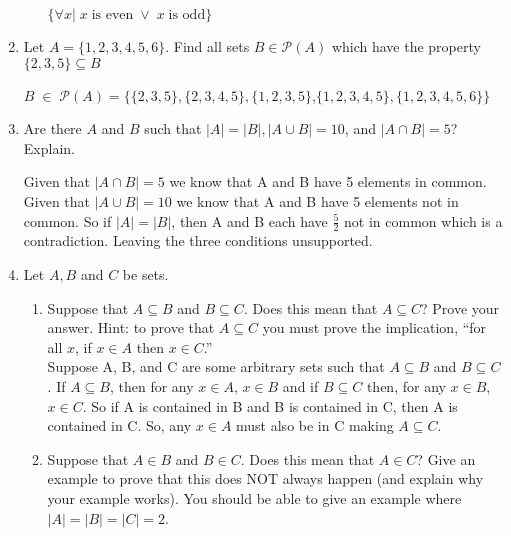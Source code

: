 \documentclass[11pt, a4paper]{article}
\newcommand\setItemNumber[1]{\setcounter{enumi}{\numexpr#1-1\relax}}
\begin{document}
\begin{enumerate}
\begin{enumerate}
                $\{\forall x|\; x\; \text{is even}\; \lor\; x\; \text{is odd}\}$ %

        \end{enumerate}

    \setItemNumber{19}
    \item Let $A = \{1,2,3,4,5,6\}$. Find all sets $B\in\mathcal{P}(A)$ which have the property $\{2,3,5\}\subseteq B$

        $B \;\in\;\mathcal{P}(A) = \{\{2,3,5\},\{2,3,4,5\},\{1,2,3,5\}$,$\{1,2,3,4,5\},\{1,2,3,4,5,6\}\}$

    \setItemNumber{22}
    \item Are there $A$ and $B$ such that $|A| = |B|,|A\cup B| = 10$, and $|A\cap B| = 5$? Explain.

        Given that $|A\cap B|=5$ we know that A and B have 5 elements in common. Given that $|A\cup B|= 10$ we know that A and B have 5 elements not in common. So if $|A|=|B|$, then A and B each have $\frac{5}{2}$ not in common which is a contradiction. Leaving the three conditions unsupported.

    \setItemNumber{25}
    \item Let $A, B$ and $C$ be sets.
        \begin{enumerate}
            \item Suppose that $A \subseteq B$ and $B\subseteq C$. Does this mean that $A \subseteq C$? Prove your answer. Hint: to prove that $A\subseteq C$ you must prove the implication, “for all $x$, if $x\in A$ then $x\in C$.”\\

                Suppose A, B, and C are some arbitrary sets such that $A\subseteq B$ and $B\subseteq C$. If $A\subseteq B$, then for any $x\in A$, $x\in B$ and if $B\subseteq C$ then, for any $x\in B$, $x\in C$. So if A is contained in B and B is contained in C, then A is contained in C. So, any $x\in A$ must also be in C making $A\subseteq C$.


            \item Suppose that $A\in B$ and $B\in C$. Does this mean that $A\in C$? Give an example to prove that this does NOT always happen (and explain why your example works). You should be able to give an example where $|A|=|B|=|C|=2$.
        \end{enumerate}



\end{enumerate}
\end{document}
